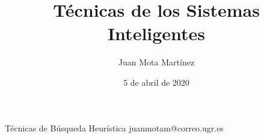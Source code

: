\documentclass[10pt]{report}
\author{Juan Mota Martínez}
\title{Técnicas de los Sistemas Inteligentes}
\date{5 de abril de 2020}
\begin{document}
				{Técnicas de Búsqueda Heurística}
            {juanmotam@correo.ugr.es}

\tableofcontents



\end{document}
